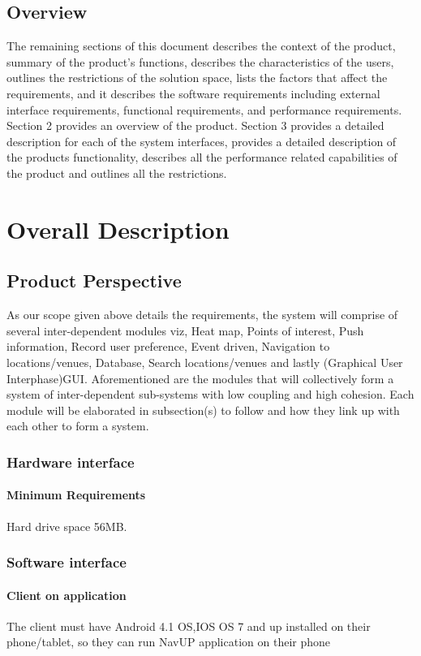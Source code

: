 \documentclass[11pt]{article}
\begin{document}
	\subsection{Overview}
	The remaining sections of this document describes the context of the product, summary of the product’s functions, describes the characteristics of the users, outlines the restrictions of the solution space, lists the factors that affect the requirements, and it describes the software requirements including external interface requirements, functional requirements,  and performance requirements. Section 2 provides an overview of the product. Section 3 provides a detailed description for each of the system interfaces, provides a detailed description of the products functionality, describes all the performance related capabilities of the product and outlines all the restrictions. 

	\section{Overall Description}
	
		\subsection{Product Perspective}
		As our scope given above details the requirements, the system will comprise of several inter-dependent modules viz, Heat map, Points of interest, Push information, Record user preference, Event driven, Navigation to locations/venues, Database, Search locations/venues and lastly (Graphical User Interphase)GUI. Aforementioned are the modules that will collectively form a system of inter-dependent sub-systems with low coupling and high cohesion. Each module will be elaborated in subsection(s) to follow and how they link up with each other to form a system. 
    \subsubsection{Hardware interface}
			\paragraph{Minimum Requirements}
      Hard drive space 56MB.
		
		\subsubsection{Software interface}
			\paragraph{Client on application}
      The client must have Android 4.1 OS,IOS OS 7 and up installed on their phone/tablet, so they can run  NavUP application on their phone
\end{document}
